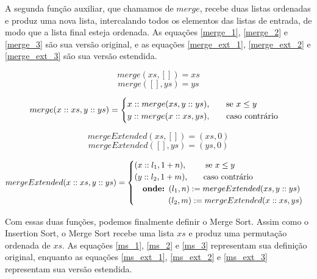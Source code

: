 \documentclass[12pt, oneside, a4paper,english,brazil]{abntex2}
\begin{document}
\qquad A segunda fun\c{c}\~ao auxiliar, que chamamos de $merge$, recebe duas listas
ordenadas e produz uma nova lista, intercalando todos os elementos das listas
de entrada, de modo que a lista final esteja ordenada. As equa\c{c}\~oes \ref{merge_1},
\ref{merge_2} e \ref{merge_3} s\~ao sua vers\~ao original, e as equa\c{c}\~oes
\ref{merge_ext_1}, \ref{merge_ext_2} e \ref{merge_ext_3} s\~ao sua vers\~ao estendida.

\begin{equation} \label{merge_1}
merge(xs, []) = xs
\end{equation}
\begin{equation} \label{merge_2}
merge([], ys) = ys
\end{equation}

\begin{equation} \label{merge_3}
merge(x :: xs, y :: ys) =
     \begin{cases}
         x :: merge(xs, y :: ys) \text{,\qquad se $x \le y$} \\
       y :: merge(x :: xs, ys) \text{,\qquad caso contr\'ario}
     \end{cases}
\end{equation}

\begin{equation} \label{merge_ext_1}
mergeExtended(xs, []) = (xs, 0)
\end{equation}
\begin{equation} \label{merge_ext_2}
mergeExtended([], ys) = (ys, 0)
\end{equation}

\begin{equation} \label{merge_ext_3}
mergeExtended(x :: xs, y :: ys) =
     \begin{cases}
       (x :: l_{1}, 1 + n) \text{,\qquad \, se $x \le y$} \\
       (y :: l_{2}, 1 + m) \text{,\qquad caso contr\'ario} \\
       \text{\quad \textbf{onde: }} (l_{1}, n) := mergeExtended(xs, y :: ys) \\
       \text{\qquad \quad \,\,\,\,\, } (l_{2}, m) := mergeExtended(x :: xs, ys)
     \end{cases}
\end{equation}

\qquad Com essas duas fun\c{c}\~oes, podemos finalmente definir o Merge Sort. Assim como o Insertion
Sort, o Merge Sort recebe uma lista $xs$ e produz uma permuta\c{c}\~ao ordenada de $xs$. As
equa\c{c}\~oes \ref{ms_1}, \ref{ms_2} e \ref{ms_3} representam sua defini\c{c}\~ao original,
enquanto as equa\c{c}\~oes \ref{ms_ext_1}, \ref{ms_ext_2} e \ref{ms_ext_3} representam
sua vers\~ao estendida.
\end{document}

